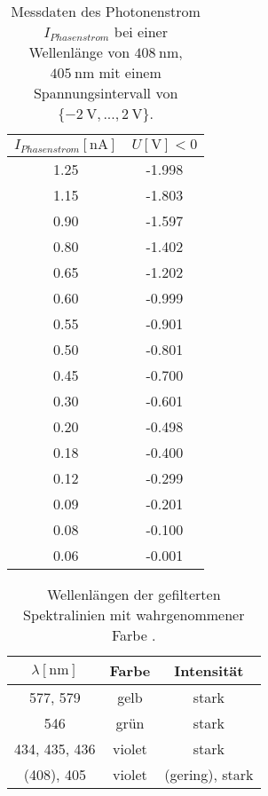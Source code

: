 \begin{table}
    \centering
    \caption{Messdaten des Photonenstrom $I_{Phasenstrom}$ bei einer Wellenlänge von $\SI{408}{\nano\meter}$, $\SI{405}{\nano\meter}$ mit einem Spannungsintervall von $\{\SI{-2}{\volt},... ,\SI{2}{\volt}\}$.}
    \label{tab:tab4}
    \begin{tabular}{c c}
        \toprule
        $I_{Phasenstrom}[\si{\nano\ampere}]$ & $U [\si{\volt}] < 0$ \\
        \midrule
1.25        &        -1.998   \\       
1.15        &        -1.803   \\
0.90        &        -1.597   \\
0.80        &        -1.402   \\
0.65        &        -1.202   \\
0.60        &        -0.999   \\
0.55        &        -0.901   \\
0.50        &        -0.801   \\
0.45        &        -0.700   \\
0.30        &        -0.601   \\
0.20        &        -0.498   \\
0.18        &        -0.400   \\
0.12        &        -0.299   \\       
0.09        &        -0.201   \\
0.08        &        -0.100   \\
0.06        &        -0.001   \\    

       \bottomrule
    \end{tabular}
\end{table}

\begin{table}
    \centering
    \caption{Wellenlängen der gefilterten Spektralinien mit wahrgenommener Farbe \cite{skript}.}
    \label{tab:tab5}
    \begin{tabular}{c c c}
        \toprule
        $\lambda [\si{\nano\meter}]$ & Farbe & Intensität \\
        \midrule
        577, 579 & gelb & stark  \\
        546& grün & stark \\
        434, 435, 436& violet & stark \\
        (408), 405 & violet & (gering), stark \\
       \bottomrule
    \end{tabular}
\end{table}